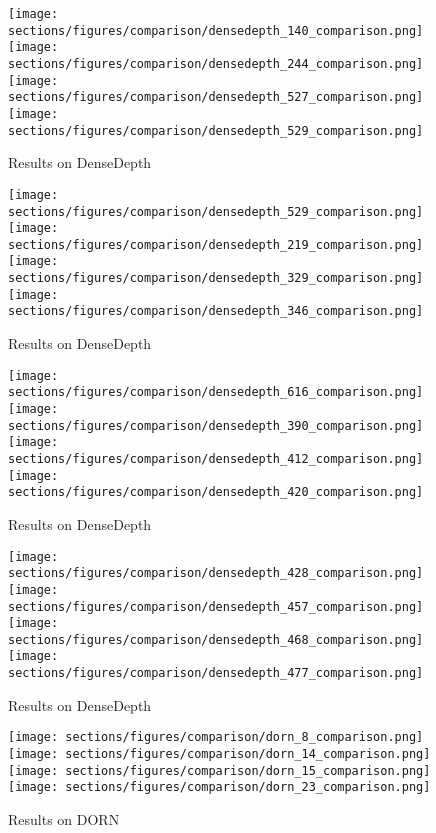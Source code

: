 \begin{figure*}
  \texttt{[image: sections/figures/comparison/densedepth\_140\_comparison.png]}
  \texttt{[image: sections/figures/comparison/densedepth\_244\_comparison.png]}
  \texttt{[image: sections/figures/comparison/densedepth\_527\_comparison.png]}
  \texttt{[image: sections/figures/comparison/densedepth\_529\_comparison.png]}
  \caption{Results on DenseDepth}
\end{figure*}
\begin{figure*}
  \texttt{[image: sections/figures/comparison/densedepth\_529\_comparison.png]}
  \texttt{[image: sections/figures/comparison/densedepth\_219\_comparison.png]}
  \texttt{[image: sections/figures/comparison/densedepth\_329\_comparison.png]}
  \texttt{[image: sections/figures/comparison/densedepth\_346\_comparison.png]}
  \caption{Results on DenseDepth}
\end{figure*}
\begin{figure*}
  \texttt{[image: sections/figures/comparison/densedepth\_616\_comparison.png]}
  \texttt{[image: sections/figures/comparison/densedepth\_390\_comparison.png]}
  \texttt{[image: sections/figures/comparison/densedepth\_412\_comparison.png]}
  \texttt{[image: sections/figures/comparison/densedepth\_420\_comparison.png]}
  \caption{Results on DenseDepth}
\end{figure*}
\begin{figure*}
  \texttt{[image: sections/figures/comparison/densedepth\_428\_comparison.png]}
  \texttt{[image: sections/figures/comparison/densedepth\_457\_comparison.png]}
  \texttt{[image: sections/figures/comparison/densedepth\_468\_comparison.png]}
  \texttt{[image: sections/figures/comparison/densedepth\_477\_comparison.png]}
  \caption{Results on DenseDepth}
\end{figure*}
\begin{figure*}
  \texttt{[image: sections/figures/comparison/dorn\_8\_comparison.png]}
  \texttt{[image: sections/figures/comparison/dorn\_14\_comparison.png]}
  \texttt{[image: sections/figures/comparison/dorn\_15\_comparison.png]}
  \texttt{[image: sections/figures/comparison/dorn\_23\_comparison.png]}
  \caption{Results on DORN}
\end{figure*}
